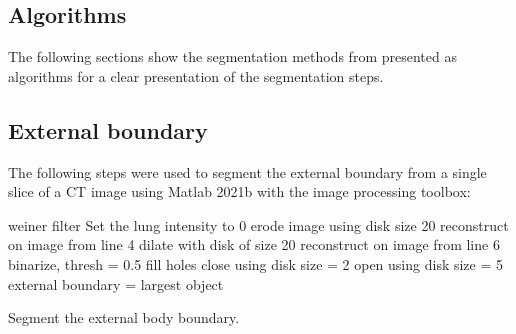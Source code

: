 \begin{appendices}
\chapter{Algorithms} \label{app:appendix-algos}
The following sections show the segmentation methods from 
presented as algorithms for a clear presentation of the segmentation steps. 
\section{External boundary}
The following steps were used to segment the external boundary 
from a single slice 
of a CT image using Matlab 2021b  
with the image processing toolbox:
\begin{algorithm}[H]
	\SetAlgoLined
		weiner filter\;
		Set the lung intensity to 0\;
		erode image using disk size 20\;
		reconstruct on image from line 4\;
		dilate with disk of size 20\;
		reconstruct on image from line 6\;
		binarize, thresh = 0.5\;
		fill holes\;
		close using disk size = 2\;
		open using disk size = 5\;
		external boundary = largest object\;
	\caption{Segment the external body boundary.}
\end{algorithm}

%

\end{appendices}